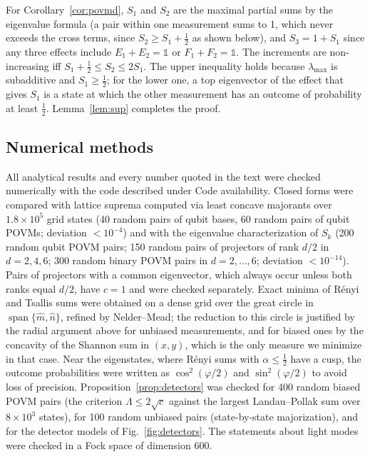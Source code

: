 \documentclass[11pt]{article}
\theoremstyle{definition}
\newcommand{\mhat}{\hat m}
\newcommand{\nhat}{\hat n}
\newcommand{\sqc}{\sqrt{c}}
\begin{document}
For Corollary~\ref{cor:povmd}, $S_1$ and $S_2$ are the maximal partial sums by the
eigenvalue formula (a pair within one measurement sums to 1, which never exceeds
the cross terms, since $S_2\ge S_1+\frac12$ as shown below), and $S_3=1+S_1$ since any three effects include
$E_1+E_2=\mathbb 1$ or $F_1+F_2=\mathbb 1$. The increments are non-increasing iff
$S_1+\frac12\le S_2\le2S_1$. The upper inequality holds because $\lambda_{\max}$ is
subadditive and $S_1\ge\frac12$; for the lower one, a top eigenvector of the effect
that gives $S_1$ is a state at which the other measurement has an outcome of
probability at least $\frac12$. Lemma~\ref{lem:sup} completes the proof.

\subsection*{Numerical methods}

All analytical results and every number quoted in the text were checked
numerically with the code described under Code availability. Closed forms were
compared with lattice suprema computed via least concave majorants over
$1.8\times10^5$ grid states (40 random pairs of qubit bases, 60 random pairs of
qubit POVMs; deviation $<10^{-4}$) and with the eigenvalue characterization of
$S_k$ (200 random qubit POVM pairs; 150 random pairs of projectors of rank $d/2$
in $d=2,4,6$; 300 random binary POVM pairs in $d=2,\dots,6$; deviation
$<10^{-14}$). Pairs of projectors with a common eigenvector, which always occur
unless both ranks equal $d/2$, have $c=1$ and were checked separately.
Exact minima of R\'enyi and Tsallis sums were obtained on a dense grid over the
great circle in $\operatorname{span}\{\mhat,\nhat\}$, refined by Nelder--Mead; the reduction to
this circle is justified by the radial argument above for unbiased measurements,
and for biased ones by the concavity of the Shannon sum in $(x,y)$, which is
the only measure we minimize in that case. Near the eigenstates, where R\'enyi
sums with $\alpha\le\frac12$ have a cusp, the outcome probabilities were written as
$\cos^2(\varphi/2)$ and $\sin^2(\varphi/2)$ to avoid loss of precision.
Proposition~\ref{prop:detectors} was checked for 400 random biased POVM pairs
(the criterion $\Lambda\le2\sqc$ against the largest Landau--Pollak sum over
$8\times10^3$ states), for 100 random unbiased pairs (state-by-state majorization),
and for the detector models of Fig.~\ref{fig:detectors}. The statements about
light modes were checked in a Fock space of dimension 600.
\end{document}
